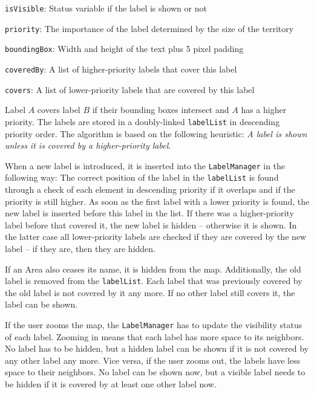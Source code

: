 \begin{compactitem}
  \item \texttt{isVisible}: Status variable if the label is shown or not
  \item \texttt{priority}: The importance of the label determined by the size of the territory
  \item \texttt{boundingBox}: Width and height of the text plus 5 pixel padding
  \item \texttt{coveredBy}: A list of higher-priority labels that cover this label
  \item \texttt{covers}: A list of lower-priority labels that are covered by this label
\end{compactitem}

Label $A$ covers label $B$ if their bounding boxes intersect and $A$ has a higher priority. The labels are stored in a doubly-linked \texttt{labelList} in descending priority order. The algorithm is based on the following heuristic: \emph{A label is shown unless it is covered by a higher-priority label}.

When a new label is introduced, it is inserted into the \texttt{LabelManager} in the following way: The correct position of the label in the \texttt{labelList} is found through a check of each element in descending priority if it overlaps and if the priority is still higher. As soon as the first label with a lower priority is found, the new label is inserted before this label in the list. If there was a higher-priority label before that covered it, the new label is hidden -- otherwise it is shown. In the latter case all lower-priority labels are checked if they are covered by the new label -- if they are, then they are hidden.

If an Area also ceases its name, it is hidden from the map. Additionally, the old label is removed from the \texttt{labelList}. Each label that was previously covered by the old label is not covered by it any more. If no other label still covers it, the label can be shown.

If the user zooms the map, the \texttt{LabelManager} has to update the visibility status of each label. Zooming in  means that each label has more space to its neighbors. No label has to be hidden, but a hidden label can be shown if it is not covered by any other label any more. Vice versa, if the user zooms out, the labels have less space to their neighbors. No label can be shown now, but a visible label needs to be hidden if it is covered by at least one other label now.

